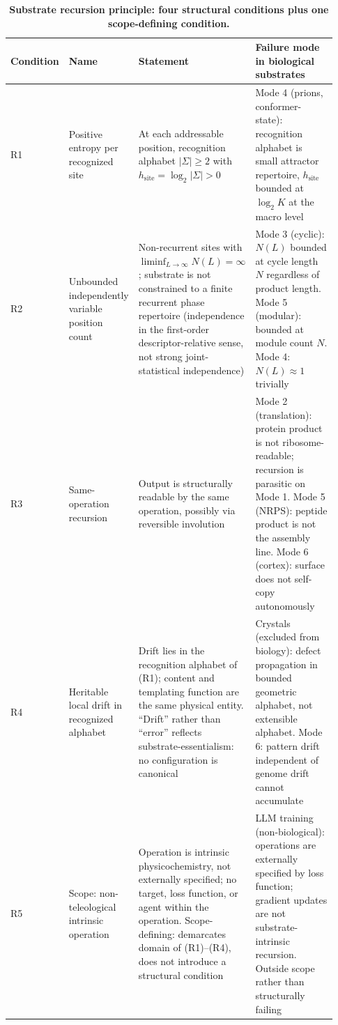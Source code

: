 \documentclass[aps,prx,reprint,amsmath,amssymb,floatfix,superscriptaddress,nofootinbib]{revtex4-2}
\theoremstyle{plain-thm}
\theoremstyle{definition-thm}
\begin{document}
\begin{table}
\caption{\textbf{Substrate recursion principle: four structural conditions plus one scope-defining condition.}}
\label{tab:principle}
\begin{tabular}{p{0.05\linewidth} p{0.18\linewidth} p{0.30\linewidth} p{0.40\linewidth}}
\toprule
Condition & Name & Statement & Failure mode in biological substrates \\
\midrule
R1 & Positive entropy per recognized site & At each addressable position, recognition alphabet $|\Sigma| \ge 2$ with $h_{\mathrm{site}} = \log_2 |\Sigma| > 0$ & Mode 4 (prions, conformer-state): recognition alphabet is small attractor repertoire, $h_{\mathrm{site}}$ bounded at $\log_2 K$ at the macro level \\
R2 & Unbounded independently variable position count & Non-recurrent sites with $\liminf_{L\to\infty} N(L) = \infty$; substrate is not constrained to a finite recurrent phase repertoire (independence in the first-order descriptor-relative sense, not strong joint-statistical independence) & Mode 3 (cyclic): $N(L)$ bounded at cycle length $N$ regardless of product length. Mode 5 (modular): bounded at module count $N$. Mode 4: $N(L) \approx 1$ trivially \\
R3 & Same-operation recursion & Output is structurally readable by the same operation, possibly via reversible involution & Mode 2 (translation): protein product is not ribosome-readable; recursion is parasitic on Mode 1. Mode 5 (NRPS): peptide product is not the assembly line. Mode 6 (cortex): surface does not self-copy autonomously \\
R4 & Heritable local drift in recognized alphabet & Drift lies in the recognition alphabet of (R1); content and templating function are the same physical entity. ``Drift'' rather than ``error'' reflects substrate-essentialism: no configuration is canonical & Crystals (excluded from biology): defect propagation in bounded geometric alphabet, not extensible alphabet. Mode 6: pattern drift independent of genome drift cannot accumulate \\
R5 & Scope: non-teleological intrinsic operation & Operation is intrinsic physicochemistry, not externally specified; no target, loss function, or agent within the operation. Scope-defining: demarcates domain of (R1)--(R4), does not introduce a structural condition & LLM training (non-biological): operations are externally specified by loss function; gradient updates are not substrate-intrinsic recursion. Outside scope rather than structurally failing \\
\bottomrule
\end{tabular}
\end{table}
\end{document}
